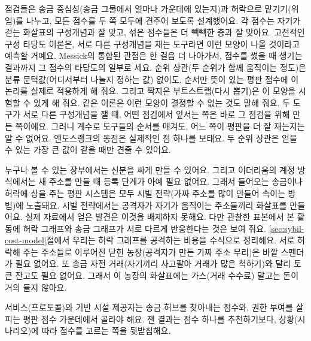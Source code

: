 
점검들은 송금 중심성(송금 그물에서 얼마나 가운데에 있는지)과 허락으로 맡기기(위임)를 나누고, 모든 점수를 두 쪽 모두에 견주어 보도록 설계했어요. 각 점수는 자기가 걷는 화살표의 구성개념과 잘 맞고, 섞은 점수들은 더 빽빽한 층과 잘 맞아요. 고전적인 구성 타당도 이론은, 서로 다른 구성개념을 재는 도구라면 이런 모양이 나올 것이라고 예측할 거예요. Messick의 통합된 관점은 한 걸음 더 나아가서, 점수를 썼을 때 생기는 결과까지 그 점수의 타당도의 일부로 세요. 순위 상관(두 순위가 함께 움직이는 정도)은 분류 문턱값(어디서부터 나눌지 정하는 값) 없이도, 순서만 뜻이 있는 평판 점수에 이 논리를 실제로 적용하게 해 줘요. 그리고 짝지은 부트스트랩(다시 뽑기)은 이 모양을 시험할 수 있게 해 줘요. 같은 이론은 이런 모양이 결정할 수 없는 것도 말해 줘요. 두 도구가 서로 다른 구성개념을 잴 때, 어떤 점검에서 앞서는 쪽은 바로 그 점검을 위해 만든 쪽이에요. 그러니 계수로 도구들의 순서를 매겨도, 어느 쪽이 평판을 더 잘 재는지는 알 수 없어요. 엔도스랭크의 동점은 실제적인 점 하나를 보태요. 두 순위 상관은 얻을 수 있는 가장 큰 값이 같을 때만 견줄 수 있어요.


누구나 볼 수 있는 장부에서는 신분을 싸게 만들 수 있어요. 그리고 이더리움의 계정 방식에서는 새 주소를 만들 때 등록 단계가 아예 필요 없어요. 그래서 들어오는 송금이나 허락에 상을 주는 평판 시스템은 모두 시빌 전략(가짜 주소를 많이 만들어 속이는 방법)에 노출돼요. 시빌 전략에서는 공격자가 자기가 움직이는 주소들끼리 화살표를 만들어요. 실제 자료에서 얻은 발견은 이것을 배제하지 못해요. 다만 관찰한 표본에서 본 활동에 허락 그래프와 송금 그래프가 서로 다르게 반응한다는 것은 보여 줘요. \ref{sec:sybil-cost-model}절에서 우리는 허락 그래프를 공격하는 비용을 수식으로 정리해요. 서로 허락해 주는 주소들로 이루어진 닫힌 농장(공격자가 만든 가짜 주소 무리)은 바깥 스펜더가 필요 없어요. 또 송금 자전 거래(자기끼리 사고팔아 거래가 많은 척하기)와 달리 토큰 잔고도 필요 없어요. 그래서 이 농장의 화살표에는 가스(거래 수수료) 말고는 돈이 거의 들지 않아요.


서비스(프로토콜)와 기반 시설 제공자는 송금 허브를 찾아내는 점수와, 권한 부여를 살피는 평판 점수 가운데에서 골라야 해요. 잰 결과는 점수 하나를 추천하기보다, 상황(시나리오)에 따라 점수를 고르는 쪽을 뒷받침해요.

